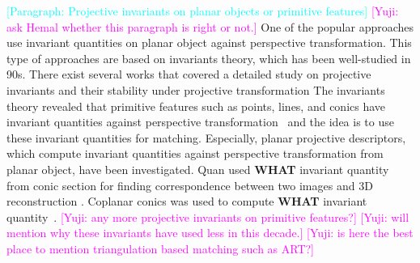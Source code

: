 \documentclass{bmvc2k}
\newcommand{\parmessage}[1]{\textcolor{cyan}{[Paragraph: #1]}}
\newcommand{\yuji}[1]{\textcolor{magenta}{[Yuji: #1]}}
\begin{document}
%
\par 
\parmessage{Projective invariants on planar objects or primitive features}
\yuji{ask Hemal whether this paragraph is right or not.}
One of the popular approaches use invariant quantities on planar object against perspective transformation.
This type of approaches are based on invariants theory, which has been well-studied in 90s.
There exist several works that covered a detailed study on projective invariants and their stability under projective transformation \cite{forsyth_91,gros_projective_1992}
The invariants theory revealed that primitive features such as points, lines, and conics have invariant quantities against perspective transformation~\cite{hartley_multiple_2003} and the idea is to use these invariant quantities for matching.
Especially, planar projective descriptors, which compute invariant quantities against perspective transformation from planar object, have been investigated.
Quan used \textbf{WHAT} invariant quantity from conic section for finding correspondence between two images and 3D reconstruction \cite{quan_conic_1996}.
Coplanar conics was used to compute \textbf{WHAT} invariant quantity~\cite{forsyth_91,Ferri_1993}.
\yuji{any more projective invariants on primitive features?}
\yuji{will mention why these invariants have used less in this decade.}
\yuji{is here the best place to mention triangulation based matching such as ART?}
\end{document}
